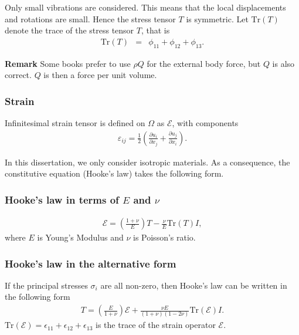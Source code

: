 \documentclass[../../main.tex]{subfiles}
\begin{document}
Only small vibrations are considered. This means that the local displacements
and rotations are small. Hence the stress tensor $T$ is symmetric. Let
$\textrm{Tr}(T)$ denote the trace of the stress tensor $T$, that is
\begin{eqnarray}
	\textrm{Tr}(T) & = & \phi_{11} + \phi_{12} + \phi_{13}. \label{eq:stress_tensor_t}
\end{eqnarray}

\textbf{Remark} Some books prefer to use $\rho Q$ for the external body force, but $Q$ is also correct. $Q$ is then a force per unit volume.

\subsubsection*{Strain}\label{sssec:3D_Model:Strain}
Infinitesimal strain tensor is defined on $\Omega$ as $\mathcal{E}$, with components
\begin{eqnarray}
	\varepsilon_{ij} = \frac{1}{2}\left( \frac{\partial u_i}{\partial x_j} + \frac{\partial u_j}{\partial x_i} \right). \label{eq:3D_Model:Strain}
\end{eqnarray}

In this dissertation, we only consider isotropic materials. As a consequence,
the constitutive equation (Hooke's law) takes the following form.

\subsubsection*{Hooke's law in terms of $E$ and $\nu$}\label{sssec:3D_Model:Hooke'sLaw1}
\begin{eqnarray}
	\mathcal{E} = \left( \frac{1+\nu}{E} \right)T - \frac{\nu}{E}\textrm{Tr}(T)I,  \label{eq:3D_Model:HL}
\end{eqnarray} where $E$ is Young's Modulus and $\nu$ is Poisson's ratio.

\subsubsection*{Hooke's law in the alternative form}\label{sssec:3D_Model:Hooke'sLaw2}
If the principal stresses $\sigma_i$ are all non-zero, then Hooke's law can be written in the following form
\begin{eqnarray}
	T = \left( \frac{E}{1+\nu} \right)\mathcal{E} + \frac{\nu E}{(1+\nu)(1-2\nu)}\textrm{Tr}(\mathcal{E})I \label{eq:3D_Model:CE}.
\end{eqnarray}
$\textrm{Tr}(\mathcal{E}) = \epsilon_{11} + \epsilon_{12} + \epsilon_{13}$ is the trace of the strain operator $\mathcal{E}$.\\
\end{document}
